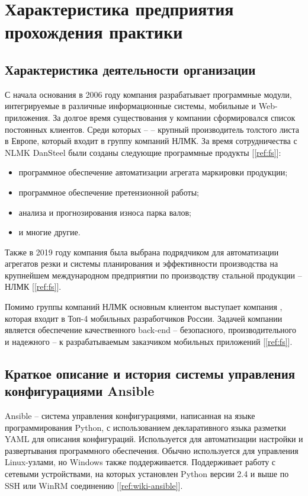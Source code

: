 \chapter{Характеристика предприятия прохождения практики}
\section{Характеристика деятельности организации}
С начала основания в 2006 году компания  разрабатывает
программные модули, интегрируемые в различные информационные системы, мобильные
и Web- приложения. За долгое время существования у компании сформировался список
постоянных клиентов. Среди которых --  -- крупный
производитель толстого листа в Европе, который входит в группу компаний НЛМК. За
время сотрудничества с NLMK DanSteel были созданы следующие программные
продукты [\ref{ref:fs}]:
\begin{itemize}
    \item программное обеспечение автоматизации агрегата маркировки продукции;
    \item программное обеспечение претензионной работы;
    \item анализа и прогнозирования износа парка валов;
    \item и многие другие.
\end{itemize}

Также в 2019 году компания была выбрана подрядчиком для автоматизации агрегатов
резки и системы планирования и эффективности производства на крупнейшем
международном предприятии по производству стальной продукции -- НЛМК [\ref{ref:fs}].

Помимо группы компаний НЛМК основным клиентом  выступает
компания , которая входит в Топ-4 мобильных разработчиков
России. Задачей компании является обеспечение качественного back-end --
безопасного, производительного и надежного -- к разрабатываемым заказчиком
мобильных приложений [\ref{ref:fs}].

\section{Краткое описание и история системы управления конфигурациями Ansible}
Ansible -- система управления конфигурациями, написанная на языке
программирования Python, с использованием декларативного языка разметки YAML для
описания конфигураций. Используется для автоматизации настройки и развертывания
программного обеспечения. Обычно используется для управления Linux-узлами, но
Windows также поддерживается. Поддерживает работу с сетевыми устройствами, на
которых установлен Python версии 2.4 и выше по SSH или WinRM соединению
[\ref{ref:wiki-ansible}].

